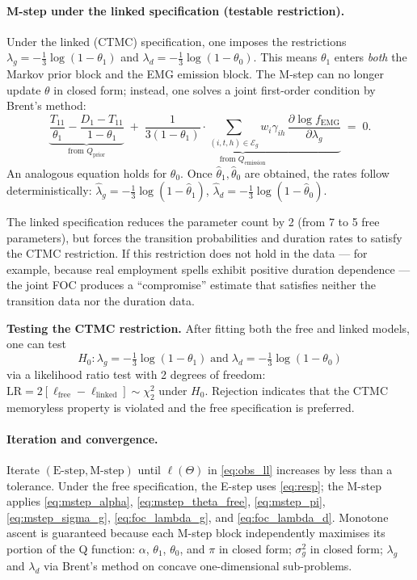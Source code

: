 \documentclass[12pt]{article}
\begin{document}
\paragraph{M-step under the linked specification (testable restriction).}
\label{sec:ctmc_test}

Under the linked (CTMC) specification, one imposes the restrictions \(\lambda_g = -\tfrac{1}{3}\log(1-\theta_1)\) and \(\lambda_d = -\tfrac{1}{3}\log(1-\theta_0)\). This means \(\theta_1\) enters \emph{both} the Markov prior block and the EMG emission block. The M-step can no longer update \(\theta\) in closed form; instead, one solves a joint first-order condition by Brent's method:
\begin{equation}
\underbrace{\frac{T_{11}}{\theta_1} - \frac{D_1 - T_{11}}{1-\theta_1}}_{\text{from } Q_{\mathrm{prior}}} \;+\; \underbrace{\frac{1}{3(1-\theta_1)} \cdot \sum_{(i,t,h)\in\mathcal{E}_g} w_i\gamma_{ih}\,\frac{\partial \log f_{\mathrm{EMG}}}{\partial \lambda_g}}_{\text{from } Q_{\mathrm{emission}}} \;=\; 0.
\label{eq:foc_theta1_linked}
\end{equation}
An analogous equation holds for \(\theta_0\). Once \(\hat{\theta}_1, \hat{\theta}_0\) are obtained, the rates follow deterministically: \(\hat{\lambda}_g = -\tfrac{1}{3}\log(1-\hat{\theta}_1)\), \(\hat{\lambda}_d = -\tfrac{1}{3}\log(1-\hat{\theta}_0)\).

The linked specification reduces the parameter count by 2 (from 7 to 5 free parameters), but forces the transition probabilities and duration rates to satisfy the CTMC restriction. If this restriction does not hold in the data --- for example, because real employment spells exhibit positive duration dependence --- the joint FOC produces a ``compromise'' estimate that satisfies neither the transition data nor the duration data.

\textbf{Testing the CTMC restriction.} After fitting both the free and linked models, one can test
\[
H_0: \lambda_g = -\tfrac{1}{3}\log(1-\theta_1) \;\text{and}\; \lambda_d = -\tfrac{1}{3}\log(1-\theta_0)
\]
via a likelihood ratio test with 2 degrees of freedom: \(\mathrm{LR} = 2[\ell_{\text{free}} - \ell_{\text{linked}}] \sim \chi^2_2\) under \(H_0\). Rejection indicates that the CTMC memoryless property is violated and the free specification is preferred.


\paragraph{Iteration and convergence.}
Iterate \((\text{E-step},\text{M-step})\) until \(\ell(\Theta)\) in \eqref{eq:obs_ll} increases by less than a tolerance. Under the free specification, the E-step uses \eqref{eq:resp}; the M-step applies \eqref{eq:mstep_alpha}, \eqref{eq:mstep_theta_free}, \eqref{eq:mstep_pi}, \eqref{eq:mstep_sigma_g}, \eqref{eq:foc_lambda_g}, and \eqref{eq:foc_lambda_d}. Monotone ascent is guaranteed because each M-step block independently maximises its portion of the Q function: \(\alpha\), \(\theta_1\), \(\theta_0\), and \(\pi\) in closed form; \(\sigma_g^2\) in closed form; \(\lambda_g\) and \(\lambda_d\) via Brent's method on concave one-dimensional sub-problems.
\end{document}

